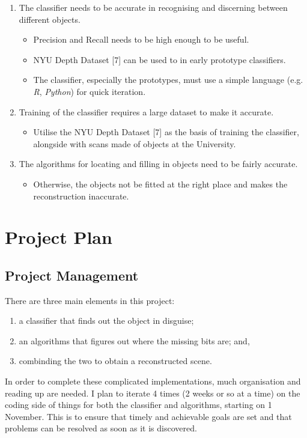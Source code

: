 \documentclass[11pt,openright,a4paper]{report}
\begin{document}
\begin{enumerate}
  \item The classifier needs to be accurate in recognising and discerning between different objects.
    \begin{itemize}
      \item Precision and Recall needs to be high enough to be useful.
      \item NYU Depth Dataset [7] can be used to in early prototype classifiers.
      \item The classifier, especially the prototypes, must use a simple language (e.g. \textit{R}, \textit{Python}) for quick iteration.
    \end{itemize}
  \item Training of the classifier requires a large dataset to make it accurate.
    \begin{itemize}
      \item Utilise the NYU Depth Dataset [7] as the basis of training the classifier, alongside with scans made of objects at the University.
    \end{itemize}
  \item The algorithms for locating and filling in objects need to be fairly accurate.
    \begin{itemize}
      \item Otherwise, the objects not be fitted at the right place and makes the reconstruction inaccurate.
    \end{itemize} 
\end{enumerate}

\newpage


\chapter{Project Plan}
\section{Project Management}
There are three main elements in this project:
\begin{enumerate}
  \item a classifier that finds out the object in disguise;
  \item an algorithms that figures out where the missing bits are; and,
  \item combinding the two to obtain a reconstructed scene.
\end{enumerate}

In order to complete these complicated implementations, much organisation and reading up are needed. I plan to iterate 4 times (2 weeks or so at a time) on the coding side of things for both the classifier and algorithms, starting on 1 November. This is to ensure that timely and achievable goals are set and that problems can be resolved as soon as it is discovered.
\end{document}
